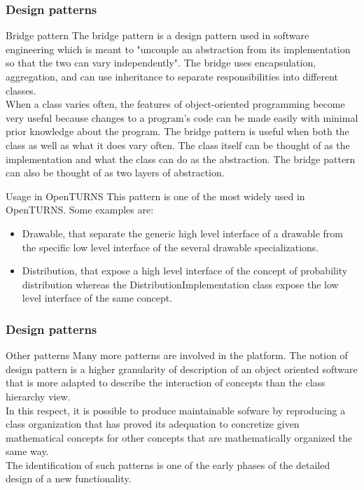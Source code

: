 \documentclass[8pt]{beamer}
\begin{document}
\begin{frame}
  \frametitle{Design patterns}
  \begin{block}{Bridge pattern}
    The \alert{bridge pattern} is a design pattern used in software engineering which is meant to "uncouple an abstraction from its implementation so that the two can vary independently". The bridge uses encapsulation, aggregation, and can use inheritance to separate responsibilities into different classes.\\
    When a class varies often, the features of object-oriented programming become very useful because changes to a program's code can be made easily with minimal prior knowledge about the program. The bridge pattern is useful when both the class as well as what it does vary often. The class itself can be thought of as the implementation and what the class can do as the abstraction. The bridge pattern can also be thought of as two layers of abstraction.
  \end{block}
  \begin{block}{Usage in OpenTURNS}
    This pattern is one of the most widely used in OpenTURNS. Some examples are:
    \begin{itemize}
    \item \alert{Drawable}, that separate the generic high level interface of a drawable from the specific low level interface of the several drawable specializations.
    \item \alert{Distribution}, that expose a high level interface of the concept of probability distribution whereas the DistributionImplementation class expose the low level interface of the same concept.
    \end{itemize}
  \end{block}
\end{frame}
\begin{frame}
  \frametitle{Design patterns}
  \begin{block}{Other patterns}
    Many more patterns are involved in the platform. The notion of design pattern is a higher granularity of description of an object oriented software that is more adapted to describe the interaction of concepts than the class hierarchy view.\\
    In this respect, it is possible to produce maintainable sofware by reproducing a class organization that has proved its adequation to concretize given mathematical concepts for other concepts that are mathematically organized the same way.\\
    The identification of such patterns is one of the early phases of the detailed design of a new functionality.
  \end{block}
\end{frame}
\end{document}
